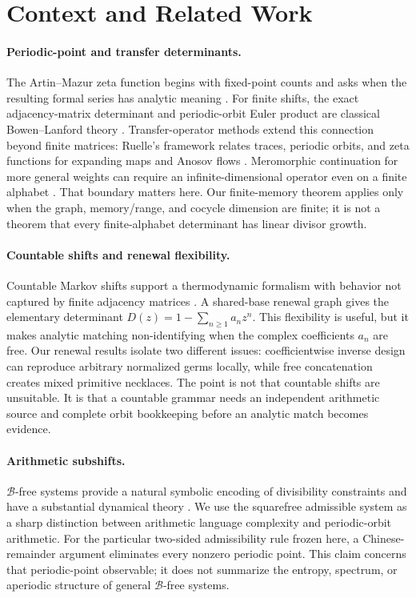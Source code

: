 \section{Context and Related Work}
\label{sec:related}

\paragraph{Periodic-point and transfer determinants.}
The Artin--Mazur zeta function begins with fixed-point counts and asks when the
resulting formal series has analytic meaning \citep{artin1965periodic}.
For finite shifts, the exact adjacency-matrix determinant and periodic-orbit
Euler product are classical Bowen--Lanford theory \citep{bowen1970zeta}.
Transfer-operator methods extend this connection beyond finite matrices:
Ruelle's framework relates traces, periodic orbits, and zeta functions for
expanding maps and Anosov flows \citep{ruelle1976zeta}.  Meromorphic
continuation for more general weights can require an infinite-dimensional
operator even on a finite alphabet \citep{pollicott1986meromorphic}.  That
boundary matters here.  Our finite-memory theorem applies only when the graph,
memory/range, and cocycle dimension are finite; it is not a theorem that every
finite-alphabet determinant has linear divisor growth.

\paragraph{Countable shifts and renewal flexibility.}
Countable Markov shifts support a thermodynamic formalism with behavior not
captured by finite adjacency matrices \citep{sarig1999thermodynamic}.  A
shared-base renewal graph gives the elementary determinant
\(D(z)=1-\sum_{n\ge1}a_nz^n\).  This flexibility is useful, but it makes
analytic matching non-identifying when the complex coefficients \(a_n\) are
free.  Our renewal results isolate two different issues: coefficientwise
inverse design can reproduce arbitrary normalized germs locally, while free
concatenation creates mixed primitive necklaces.  The point is not that
countable shifts are unsuitable.  It is that a countable grammar needs an
independent arithmetic source and complete orbit bookkeeping before an
analytic match becomes evidence.

\paragraph{Arithmetic subshifts.}
\(\mathscr B\)-free systems provide a natural symbolic encoding of divisibility
constraints and have a substantial dynamical theory
\citep{elabdalaoui2015bfree}.  We use the squarefree admissible system as a
sharp distinction between arithmetic language complexity and periodic-orbit
arithmetic.  For the particular two-sided admissibility rule frozen here, a
Chinese-remainder argument eliminates every nonzero periodic point.  This
claim concerns that periodic-point observable; it does not summarize the
entropy, spectrum, or aperiodic structure of general \(\mathscr B\)-free
systems.

